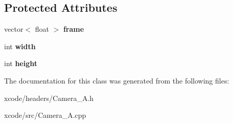 \subsection*{Protected Attributes}
\begin{DoxyCompactItemize}
\item 
\hypertarget{class_camera___a_a062e331c0b3bc525ba2f2724008d3d20}{vector$<$ float $>$ {\bfseries frame}}\label{class_camera___a_a062e331c0b3bc525ba2f2724008d3d20}

\item 
\hypertarget{class_camera___a_abe6c7a2c84c368e8e8dd366444490953}{int {\bfseries width}}\label{class_camera___a_abe6c7a2c84c368e8e8dd366444490953}

\item 
\hypertarget{class_camera___a_af2d2b7eedefafea58af3467325f4214e}{int {\bfseries height}}\label{class_camera___a_af2d2b7eedefafea58af3467325f4214e}

\end{DoxyCompactItemize}


The documentation for this class was generated from the following files\-:\begin{DoxyCompactItemize}
\item 
xcode/headers/Camera\-\_\-\-A.\-h\item 
xcode/src/Camera\-\_\-\-A.\-cpp\end{DoxyCompactItemize}
